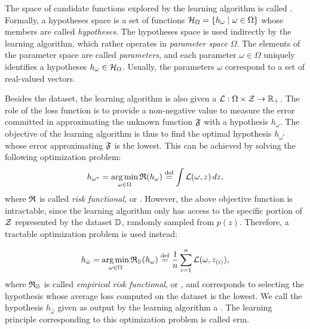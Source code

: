 The space of candidate functions explored by the learning algorithm is called . Formally, a hypotheses space is a set of functions $\HypSpace = \Set{h_{\omega} \mid \omega \in \Omega}$ whose members are called \emph{hypotheses}. The hypotheses space is used indirectly by the learning algorithm, which rather operates in \emph{parameter space} $\Omega$. The elements of the parameter space are called \emph{parameters}, and each parameter $\omega \in \Omega$ uniquely identifies a hypotheses $h_{\omega} \in \HypSpace$. Usually, the parameters $\omega$ correspond to a set of real-valued vectors.

Besides the dataset, the learning algorithm is also given a  $\Loss: \Omega \times \Cal{Z} \shortrightarrow \Real_+$. The role of the loss function is to provide a non-negative value to measure the error committed in approximating the unknown function $\mathfrak{F}$ with a hypothesis $h_{\omega}$. The objective of the learning algorithm is thus to find the optimal hypothesis $h_{\omega^*}$ whose error approximating $\mathfrak{F}$ is the lowest. This can be achieved by solving the following optimization problem:
$$h_{\omega^*} = \argmin_{\omega \in \Omega} \Risk(h_{\omega}) \defeq \int \Loss(\omega, z)\, dz,$$
where $\mathfrak{R}$ is called \emph{risk functional}, or . However, the above objective function is intractable, since the learning algorithm only has access to the specific portion of $\Cal{Z}$ represented by the dataset $\mathbb{D}$, randomly sampled from $p(z)$. Therefore, a tractable optimization problem is used instead:

$$h_{\hat{\omega}} = \argmin_{\omega \in \Omega} \Risk_{\Data}(h_{\omega}) \defeq \frac{1}{n} \sum_{i=1}^n \Loss(\omega, \Pattern{z}{i}),$$
where $\mathfrak{R}_{\mathbb{D}}$ is called \emph{empirical risk functional}, or , and corresponds to selecting the hypothesis whose average loss computed on the dataset is the lowest. We call the hypothesis $h_{\hat{\omega}}$ given as output by the learning algorithm a . The learning principle corresponding to this optimization problem is called \gls{erm}.

